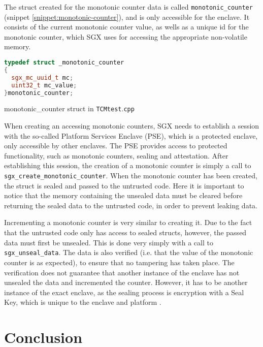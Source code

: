 \documentclass[12pt]{article}
\begin{document}
	The struct created for the monotonic counter data is called \texttt{monotonic\_counter} (snippet \ref{snippet:monotonic-counter}), and is only accessible for the enclave. It consists of the current monotonic counter value, as wells as a unique id for the monotonic counter, which SGX uses for accessing the appropriate non-volatile memory.
	\begin{snippet}[!ht]
		\begin{lstlisting}[language=C++]
typedef struct _monotonic_counter
{
  sgx_mc_uuid_t mc;
  uint32_t mc_value;
}monotonic_counter;
		\end{lstlisting}
		\caption{monotonic\_counter struct in \texttt{TCMtest$.$cpp} \label{snippet:monotonic-counter}}
	\end{snippet}

	When creating an accessing monotonic counters, SGX needs to establish a session with the so-called Platform Services Enclave (PSE), which is a protected enclave, only accessible by other enclaves. The PSE provides access to protected functionality, such as monotonic counters, sealing and attestation.
	After establishing this session, the creation of a monotonic counter is simply a call to \texttt{sgx\_create\_monotonic\_counter}.
	When the monotonic counter has been created, the struct is sealed and passed to the untrusted code. Here it is important to notice that the memory containing the unsealed data must be cleared before returning the sealed data to the untrusted code, in order to prevent leaking data.

	Incrementing a monotonic counter is very similar to creating it. Due to the fact that the untrusted code only has access to sealed structs, however, the passed data must first be unsealed. This is done very simply with a call to \texttt{sgx\_unseal\_data}. The data is also verified (i.e. that the value of the monotonic counter is as expected), to ensure that no tampering has taken place. The verification does not guarantee that another instance of the enclave has not unsealed the data and incremented the counter. However, it has to be another instance of the exact enclave, as the sealing process is encryption with a Seal Key, which is unique to the enclave and platform \cite{sgx-dev-guide}.

	\section{Conclusion}
\end{document}
